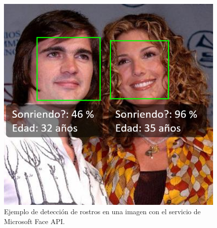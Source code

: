 \begin{figure}
\begin{centering}
\includegraphics[scale=0.5]{images/ejemplo-de-deteccion-Microsoft-API}
\par\end{centering}

\caption{Ejemplo de detección de rostros en una imagen con el servicio de Microsoft
Face API.\label{fig:Ejemplo-de-detecci=0000F3n}}
\end{figure}


